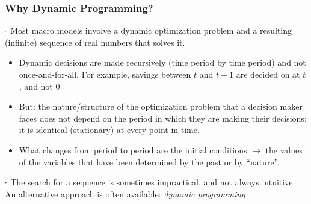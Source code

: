 \documentclass[10pt, handout]{beamer}
\begin{document}
\begin{frame}

\frametitle{Why Dynamic Programming?} \vskip 0.1in


$\square$ Most macro models involve a dynamic optimization problem and a resulting (infinite) sequence of real numbers that solves it.
\begin{itemize}
\item Dynamic decisions are made recursively (time period by time period) and not once-and-for-all. For example, savings between $t$ and $t+1$ are decided on at $t$, and not $0$

\item But: the nature/structure of the optimization problem that a decision maker faces does not depend on the period in which they are making their decisions: it is identical (stationary) at every point in time. 
\item What changes from period to period are the initial conditions
$\rightarrow$ the values of the variables that have been determined
by the past or by ``nature''.
\end{itemize}

$\square$ The search for a sequence is sometimes impractical, and not always intuitive. An alternative approach is often available: \textit{dynamic programming}  


\end{frame}
\end{document}
